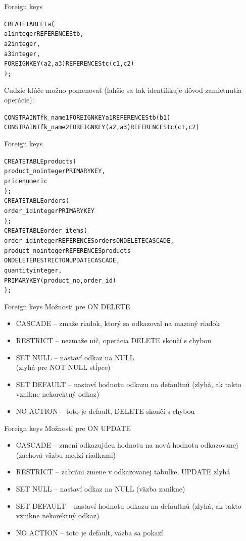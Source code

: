\documentclass[12pt]{beamer}
\def\blue#1{\textcolor{Cerulean}{#1}}
\begin{document}
\begin{frame}[fragile]{Foreign keys}
\begin{alltt}
CREATE TABLE ta (
  a1 integer \alert{REFERENCES tb},
  a2 integer,
  a3 integer,
  \alert{FOREIGN KEY (a2, a3) REFERENCES tc (c1, c2)}
);
\end{alltt}
Cudzie kľúče možno pomenovať (ľahšie sa tak identifikuje dôvod zamietnutia operácie):
{\scriptsize
\begin{alltt}
  CONSTRAINT fk_name1 FOREIGN KEY a1 REFERENCES tb (b1)
  CONSTRAINT fk_name2 FOREIGN KEY (a2, a3) REFERENCES tc (c1, c2)
\end{alltt}
}
\end{frame}

\begin{frame}[fragile]{Foreign keys}
\hbox{}{\small
\begin{alltt}
CREATE TABLE products (
  product_no integer PRIMARY KEY,
  price numeric
);
CREATE TABLE orders (
  order_id integer PRIMARY KEY
);
CREATE TABLE order_items (
  order_id integer \alert{REFERENCES orders} \blue{ON DELETE CASCADE},
  product_no integer \alert{REFERENCES products}
      \blue{ON DELETE RESTRICT ON UPDATE CASCADE},
  quantity integer,
  PRIMARY KEY (product_no, order_id)
);
\end{alltt}
}
\end{frame}

\begin{frame}[fragile]{Foreign keys}
Možnosti pre \blue{ON DELETE}
\begin{itemize}
\item \alert{CASCADE} -- zmaže riadok, ktorý sa odkazoval na mazaný riadok
\item \alert{RESTRICT} -- nezmaže nič, operácia DELETE skončí s chybou
\item SET NULL -- nastaví odkaz na NULL\\ (zlyhá pre NOT NULL stĺpce)
\item SET DEFAULT -- nastaví hodnotu odkazu na defaultnú
(zlyhá, ak takto vznikne nekorektný odkaz)
\item NO ACTION -- toto je default, DELETE skončí s chybou
\end{itemize}
\end{frame}

\begin{frame}[fragile]{Foreign keys}
Možnosti pre \blue{ON UPDATE}
\begin{itemize}
\item \alert{CASCADE} -- zmení odkazujúcu hodnotu na novú hodnotu odkazovanej
(zachová väzbu medzi riadkami)
\item RESTRICT -- zabráni zmene v odkazovanej tabuľke, UPDATE zlyhá
\item SET NULL -- nastaví odkaz na NULL (väzba zanikne)
\item SET DEFAULT -- nastaví hodnotu odkazu na defaultnú
(zlyhá, ak takto vznikne nekorektný odkaz)
\item NO ACTION -- toto je default, väzba sa pokazí
\end{itemize}
\end{frame}
\end{document}
